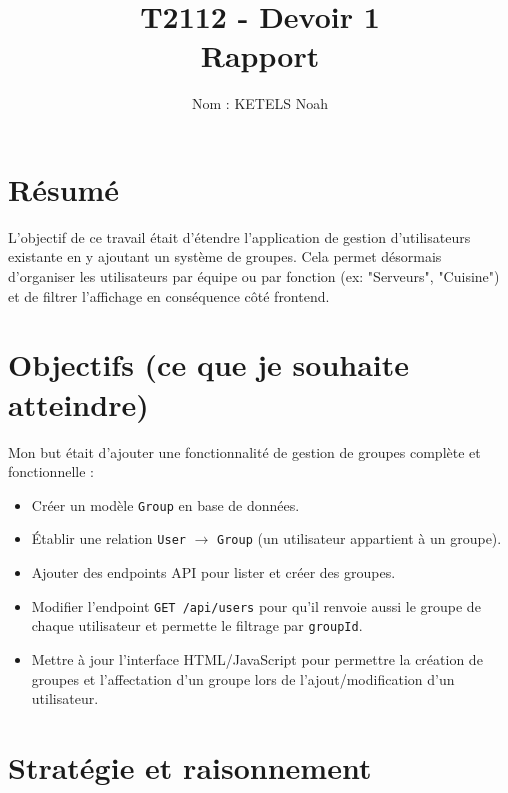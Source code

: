 \documentclass[11pt,a4paper]{article}
\title{T2112 - Devoir 1 \\Rapport}
\author{Nom : KETELS Noah}
\begin{document}
\maketitle
\tableofcontents
\bigskip

\section*{Résumé}

L'objectif de ce travail était d'étendre l'application de gestion d'utilisateurs existante en y ajoutant un système de groupes. Cela permet désormais d'organiser les utilisateurs par équipe ou par fonction (ex: "Serveurs", "Cuisine") et de filtrer l'affichage en conséquence côté frontend.

\section{Objectifs (ce que je souhaite atteindre)}

Mon but était d'ajouter une fonctionnalité de gestion de groupes complète et fonctionnelle :
\begin{itemize}
    \item Créer un modèle \texttt{Group} en base de données.
    \item Établir une relation \texttt{User} $\rightarrow$ \texttt{Group} (un utilisateur appartient à un groupe).
    \item Ajouter des endpoints API pour lister et créer des groupes.
    \item Modifier l'endpoint \texttt{GET /api/users} pour qu'il renvoie aussi le groupe de chaque utilisateur et permette le filtrage par \texttt{groupId}.
    \item Mettre à jour l'interface HTML/JavaScript pour permettre la création de groupes et l'affectation d'un groupe lors de l'ajout/modification d'un utilisateur.
\end{itemize}

\section{Stratégie et raisonnement}
\end{document}
